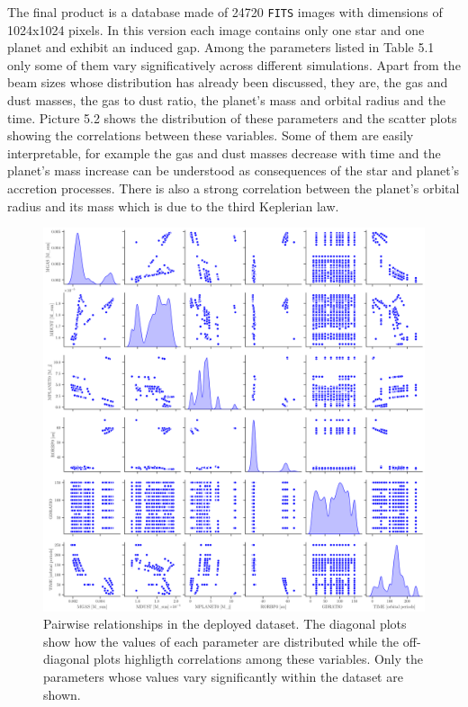 \documentclass[a4paper,10pt]{report}
\begin{document}
The final product is a database made of 24720 \lstinline{FITS} images with dimensions of 1024x1024 pixels. In this
version each image contains only one star and one planet and exhibit an induced gap.
Among the parameters listed in Table 5.1 only some of them vary significatively across different simulations.
Apart from the beam sizes whose distribution has already been discussed, they are, the gas and dust masses, the gas to dust ratio, 
the planet's mass and orbital radius and the time. Picture 5.2 shows the distribution of these parameters and the scatter
plots showing the correlations between these variables. Some of them are easily interpretable, for example the
gas and dust masses decrease with time and the planet's mass increase can be understood as consequences of the star and planet's accretion
processes. There is also a strong correlation between the planet's orbital radius and its mass which is due to the third Keplerian law.

\begin{figure}
    \begin{center}
        \includegraphics[width=\textwidth]{images/pairplot.png}
    \end{center}
    \caption{Pairwise relationships in the deployed dataset. The diagonal plots show how the values of each parameter are distributed
    while the off-diagonal plots highligth correlations among these variables. Only the parameters whose values vary
    significantly within the dataset are shown.}
\end{figure}
\end{document}
